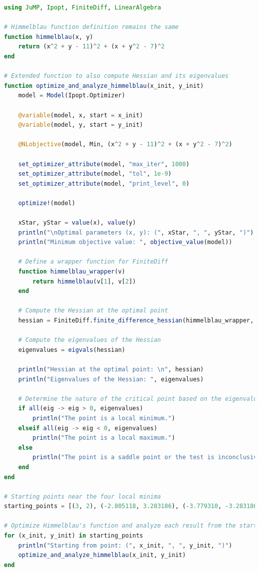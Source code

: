 \begin{lstlisting}[language=Julia,style=mystyle]
using JuMP, Ipopt, FiniteDiff, LinearAlgebra

# Himmelblau function definition remains the same
function himmelblau(x, y)
    return (x^2 + y - 11)^2 + (x + y^2 - 7)^2
end

# Extended function to also compute Hessian and its eigenvalues
function optimize_and_analyze_himmelblau(x_init, y_init)
    model = Model(Ipopt.Optimizer)
    
    @variable(model, x, start = x_init)
    @variable(model, y, start = y_init)
    
    @NLobjective(model, Min, (x^2 + y - 11)^2 + (x + y^2 - 7)^2)
    
    set_optimizer_attribute(model, "max_iter", 1000)
    set_optimizer_attribute(model, "tol", 1e-9)
    set_optimizer_attribute(model, "print_level", 0)
    
    optimize!(model)
    
    xStar, yStar = value(x), value(y)
    println("\nOptimal parameters (x, y): (", xStar, ", ", yStar, ")")
    println("Minimum objective value: ", objective_value(model))
    
    # Define a wrapper function for FiniteDiff
    function himmelblau_wrapper(v)
        return himmelblau(v[1], v[2])
    end
    
    # Compute the Hessian at the optimal point
    hessian = FiniteDiff.finite_difference_hessian(himmelblau_wrapper, [xStar, yStar])
    
    # Compute the eigenvalues of the Hessian
    eigenvalues = eigvals(hessian)
    
    println("Hessian at the optimal point: \n", hessian)
    println("Eigenvalues of the Hessian: ", eigenvalues)
    
    # Determine the nature of the critical point based on the eigenvalues
    if all(eig -> eig > 0, eigenvalues)
        println("The point is a local minimum.")
    elseif all(eig -> eig < 0, eigenvalues)
        println("The point is a local maximum.")
    else
        println("The point is a saddle point or the test is inconclusive.")
    end
end

# Starting points near the four local minima
starting_points = [(3, 2), (-2.805118, 3.283186), (-3.779310, -3.283186), (3.584428, -1.848126)]

# Optimize Himmelblau's function and analyze each result from the starting points
for (x_init, y_init) in starting_points
    println("Starting from point: (", x_init, ", ", y_init, ")")
    optimize_and_analyze_himmelblau(x_init, y_init)
end
\end{lstlisting}

